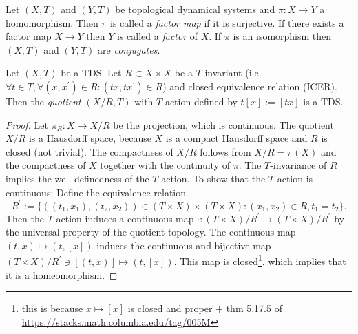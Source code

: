\begin{definition}
	Let $(X, T)$ and $(Y, T)$ be topological dynamical systems and $\pi: X \to Y$ a homomorphism. Then $\pi$ is called a \emph{factor map} if it is surjective.
	If there exists a factor map $X \to Y$ then $Y$ is called a \emph{factor} of $X$. If $\pi$ is an isomorphism then $(X, T)$ and $(Y, T)$ are \emph{conjugates}.
\end{definition}

\begin{proposition}
	Let $(X, T)$ be a TDS. Let $R \subset X \times X$ be a $T$-invariant (i.e. $\forall t \in T, \forall (x, x^\prime ) \in R : (tx, tx^\prime) \in R$) and closed equivalence relation (ICER). Then the \emph{quotient} $(X/R, T)$ with $T$-action defined by $t[x] := [tx]$ is a TDS.
\end{proposition}
\begin{proof}
	Let $\pi_R: X \to X/R$ be the projection, which is continuous. The quotient $X/R$ is a Hausdorff space, because $X$ is a compact Hausdorff space and $R$ is closed (not trivial). The compactness of $X/R$ follows from $X/R = \pi(X)$ and the compactness of $X$ together with the continuity of $\pi$. The $T$-invariance of $R$ implies the well-definedness of the $T$-action. To show that the $T$ action is continuous: Define the equivalence relation
	\begin{equation*}
		R^\prime := \{ ((t_1,x_1), (t_2,x_2)) \in (T \times X) \times (T \times X): (x_1, x_2) \in R, t_1 = t_2\}.
	\end{equation*}
	Then the $T$-action induces a continuous map $\cdot : (T \times X)/R^\prime \to (T\times X)/R^\prime$ by the universal property of the quotient topology. The continuous map $(t, x) \mapsto (t, [x])$ induces the continuous and bijective map $(T\times X)/R^\prime \ni [(t, x)] \mapsto (t, [x])$. This map is closed\footnote{this is because $x \mapsto [x]$ is closed and proper + thm 5.17.5 of \url{https://stacks.math.columbia.edu/tag/005M}}, which implies that it is a homeomorphism.
\end{proof}

